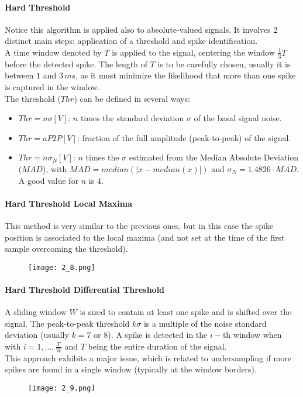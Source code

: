 \paragraph{Hard Threshold} Notice this algorithm is applied also to absolute-valued
signals. It involves 2 distinct main steps: application of a threshold and spike identification.\\
A time window denoted by \(T\) is applied to the signal, centering the window \(\frac{1}{3}T\) before the detected spike.
The length of \(T\) is to be carefully chosen, usually it is between \(1\) and \(3\,ms\), as it must minimize the likelihood
that more than one spike is captured in the window.\\
The threshold (\(Thr\)) can be defined in several ways:
\begin{itemize}
    \item \(Thr=n\sigma[V]\): \(n\) times the standard deviation \(\sigma\) of the basal signal noise.
    \item \(Thr=aP2P[V]\): fraction of the full amplitude (peak-to-peak) of the signal.
    \item \(Thr=n\sigma_N[V]\): \(n\) times the \(\sigma\) estimated from the
          Median Absolute Deviation (\(MAD\)), with \(MAD=median(|x-median(x)|)\) and \(\sigma_N=1.4826\cdot MAD\). 
          A good value for \(n\) is \(4\).
\end{itemize}
\paragraph{Hard Threshold Local Maxima}
This method is very similar to the previous ones, but in this case the spike position is
associated to the local maxima (and not set at the time of the first sample overcoming the threshold).
\begin{figure}[H]
    \centering
    \texttt{[image: 2\_8.png]}
\end{figure}
\paragraph{Hard Threshold Differential Threshold}
A sliding window \(W\) is sized to contain at least one spike and is shifted over the signal.
The peak-to-peak threshold \(k\sigma\) is a multiple of the noise standard deviation (usually \(k=7\) or \(8\)).
A spike is detected in the \(i-\)th window when
\begin{equation*}
    [(max_i-min_i)\ge{k\sigma}]
\end{equation*}
with \(i=1,\dots,\frac{T}{W}\) and \(T\) being the entire duration of the signal.\\
This approach exhibits a major issue, which is related to undersampling if more spikes are found
in a single window (typically at the window borders).
\begin{figure}[H]
    \centering
    \texttt{[image: 2\_9.png]}
\end{figure}

